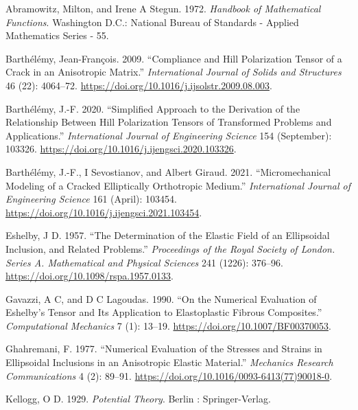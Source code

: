 \documentclass[
  letterpaper,
  DIV=11,
  numbers=noendperiod]{scrreprt}
\newlength{\cslhangindent}
\newlength{\cslentryspacingunit} %
\newenvironment{CSLReferences}[2] %
 {%
  \setlength{\parindent}{0pt}
  \ifodd #1
  \let\oldpar\par
  \def\par{\hangindent=\cslhangindent\oldpar}
  \fi
  \setlength{\parskip}{#2\cslentryspacingunit}
 }%
 {}
\begin{document}
\hypertarget{refs}{}
\begin{CSLReferences}{1}{0}
\leavevmode{}%
Abramowitz, Milton, and Irene A Stegun. 1972. \emph{Handbook of
{Mathematical Functions}}. {Washington D.C.}: {National Bureau of
Standards - Applied Mathematics Series - 55}.

\leavevmode{}%
Barthélémy, Jean-François. 2009. {``Compliance and {Hill} Polarization
Tensor of a Crack in an Anisotropic Matrix.''} \emph{International
Journal of Solids and Structures} 46 (22): 4064--72.
\url{https://doi.org/10.1016/j.ijsolstr.2009.08.003}.

\leavevmode{}%
Barthélémy, J.-F. 2020. {``Simplified Approach to the Derivation of the
Relationship Between {Hill} Polarization Tensors of Transformed Problems
and Applications.''} \emph{International Journal of Engineering Science}
154 (September): 103326.
\url{https://doi.org/10.1016/j.ijengsci.2020.103326}.

\leavevmode{}%
Barthélémy, J.-F., I Sevostianov, and Albert Giraud. 2021.
{``Micromechanical Modeling of a Cracked Elliptically Orthotropic
Medium.''} \emph{International Journal of Engineering Science} 161
(April): 103454. \url{https://doi.org/10.1016/j.ijengsci.2021.103454}.

\leavevmode{}%
Eshelby, J D. 1957. {``The Determination of the Elastic Field of an
Ellipsoidal Inclusion, and Related Problems.''} \emph{Proceedings of the
Royal Society of London. Series A. Mathematical and Physical Sciences}
241 (1226): 376--96. \url{https://doi.org/10.1098/rspa.1957.0133}.

\leavevmode{}%
Gavazzi, A C, and D C Lagoudas. 1990. {``On the Numerical Evaluation of
{Eshelby}'s Tensor and Its Application to Elastoplastic Fibrous
Composites.''} \emph{Computational Mechanics} 7 (1): 13--19.
\url{https://doi.org/10.1007/BF00370053}.

\leavevmode{}%
Ghahremani, F. 1977. {``Numerical Evaluation of the Stresses and Strains
in Ellipsoidal Inclusions in an Anisotropic Elastic Material.''}
\emph{Mechanics Research Communications} 4 (2): 89--91.
\url{https://doi.org/10.1016/0093-6413(77)90018-0}.

\leavevmode{}%
Kellogg, O D. 1929. \emph{Potential Theory}. {Berlin : Springer-Verlag}.


\end{CSLReferences}
\end{document}

